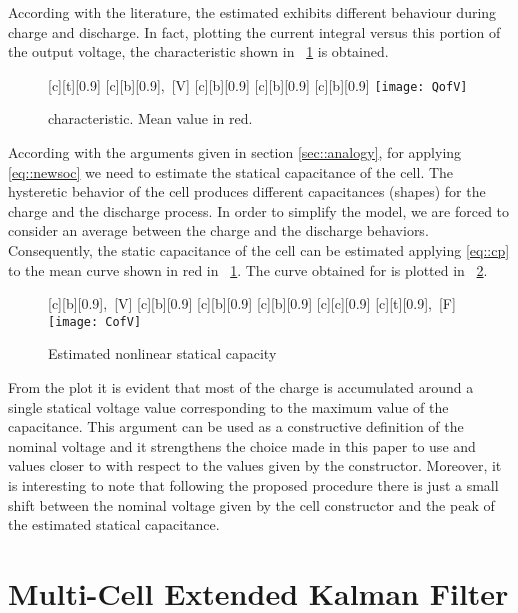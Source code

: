 \documentclass[journal]{IEEEtran}
\begin{document}
According with the literature, the estimated  exhibits different behaviour during charge and discharge. In fact, plotting the current integral  versus this portion of the output voltage, the characteristic  shown in \figurename~\ref{fig::OCVSOC} is obtained. 
\begin{figure}[!htbp]
    [c][t][0.9]{\scriptsize{}}
    [c][b][0.9]{\scriptsize{,~[V]}}
    [c][b][0.9]{\scriptsize{}}
    [c][b][0.9]{\scriptsize{}}
    [c][b][0.9]{\scriptsize{}}
	\centering
		\texttt{[image: QofV]}
	\caption{ characteristic. Mean value in red.}
	\label{fig::OCVSOC}
\end{figure}
According with the arguments given in section \ref{sec::analogy}, for applying \eqref{eq::newsoc} we need to estimate the statical capacitance of the cell. The hysteretic behavior of the cell produces different capacitances (shapes) for the charge and the discharge process. In order to simplify the model, we are forced to consider an average between the charge and the discharge behaviors. Consequently, the static capacitance of the cell  can be estimated applying \eqref{eq::cp} to the mean curve shown in red in \figurename~\ref{fig::OCVSOC}. The curve obtained for   is plotted in \figurename~\ref{fig::capqst}.
\begin{figure}[!htbp]
    [c][b][0.9]{\scriptsize{,~[V]}}
    [c][b][0.9]{\scriptsize{}}
    [c][b][0.9]{\scriptsize{}}
    [c][b][0.9]{\scriptsize{}}
    [c][c][0.9]{\scriptsize{}}
    [c][t][0.9]{\scriptsize{,~[F]}}
	\centering
		\texttt{[image: CofV]}
	\caption{Estimated nonlinear statical capacity}
	\label{fig::capqst}
\end{figure}
From the plot it is evident that most of the charge is accumulated around a single statical voltage value corresponding to the maximum value of the capacitance. This argument can be used as a constructive definition of the nominal voltage  and it strengthens the choice made in this paper to use  and  values closer to  with respect to the values given by the constructor. Moreover, it is interesting to note that following the proposed procedure there is just a small shift  between the nominal voltage given by the cell constructor and the peak of the estimated statical capacitance. 
\section{Multi-Cell Extended Kalman Filter}
\label{sec::multi_cell_ekf}
\end{document}
